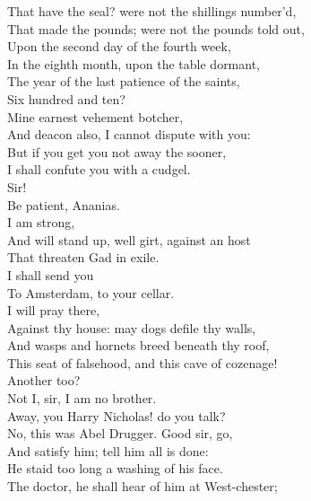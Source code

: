 \documentclass{memoir}
\begin{document}
\begin{drama*}
 That have the seal? were not the shillings number'd,\\
 That made the pounds; were not the pounds told out,\\
 Upon the second day of the fourth week,\\
 In the eighth month, upon the table dormant,\\
 The year of the last patience of the saints,\\
 Six hundred and ten?\\
\lovewitspeaks {} Mine earnest vehement botcher,\\
 And deacon also, I cannot dispute with you:\\
 But if you get you not away the sooner,\\
 I shall confute you with a cudgel.\\
\ananiasspeaks  Sir!\\
\tribulationspeaks {} Be patient, Ananias.\\
\ananiasspeaks {} I am strong,\\
 And will stand up, well girt, against an host\\
 That threaten Gad in exile.\\
\lovewitspeaks {} I shall send you\\
 To Amsterdam, to your cellar.\\
\ananiasspeaks {} I will pray there,\\
 Against thy house: may dogs defile thy walls,\\
 And wasps and hornets breed beneath thy roof,\\
 This seat of falsehood, and this cave of cozenage!\\
\lovewitspeaks  Another too?\\
\druggerspeaks {} Not I, sir, I am no brother.\\
\lovewitspeaks {} Away, you Harry Nicholas! do you talk?\\
\facespeaks  No, this was Abel Drugger. Good sir, go,\\
 And satisfy him; tell him all is done:\\
 He staid too long a washing of his face.\\
 The doctor, he shall hear of him at West-chester;\\

\end{drama*}
\end{document}
